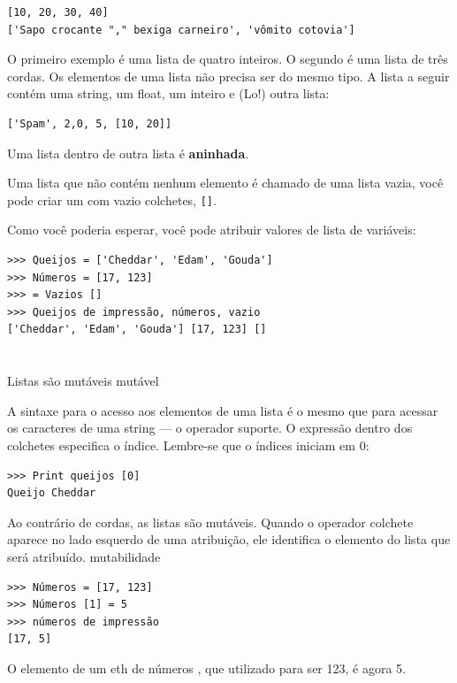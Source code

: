 \documentclass[10pt]{book}
\begin{document}
\begin{exercise}
\begin{verbatim}
[10, 20, 30, 40]
['Sapo crocante "," bexiga carneiro', 'vômito cotovia']
\end{verbatim}
%
O primeiro exemplo é uma lista de quatro inteiros. O segundo é uma lista de
três cordas. Os elementos de uma lista não precisa ser do mesmo tipo.
A lista a seguir contém uma string, um float, um inteiro e
(Lo!) outra lista:

\begin{verbatim}
['Spam', 2,0, 5, [10, 20]]
\end{verbatim}
%
Uma lista dentro de outra lista é {\bf aninhada}.

Uma lista que não contém nenhum elemento é
chamado de uma lista vazia, você pode criar um com vazio
colchetes, \verb "[]".

Como você poderia esperar, você pode atribuir valores de lista de variáveis:

\begin{verbatim}
>>> Queijos = ['Cheddar', 'Edam', 'Gouda']
>>> Números = [17, 123]
>>> = Vazios []
>>> Queijos de impressão, números, vazio
['Cheddar', 'Edam', 'Gouda'] [17, 123] []
\end{verbatim}
%


\section {} Listas são mutáveis
\label{} mutável

A sintaxe para o acesso aos elementos de uma lista é o mesmo que para
acessar os caracteres de uma string --- o operador suporte. O
expressão dentro dos colchetes especifica o índice. Lembre-se que o
índices iniciam em 0:

\begin{verbatim}
>>> Print queijos [0]
Queijo Cheddar
\end{verbatim}
%
Ao contrário de cordas, as listas são mutáveis. Quando o operador colchete aparece
no lado esquerdo de uma atribuição, ele identifica o elemento do
lista que será atribuído.
\index{} mutabilidade

\begin{verbatim}
>>> Números = [17, 123]
>>> Números [1] = 5
>>> números de impressão
[17, 5]
\end{verbatim}
%
O elemento de um eth de números {\tt}, que
utilizado para ser 123, é agora 5.


\end{exercise}
\end{document}
